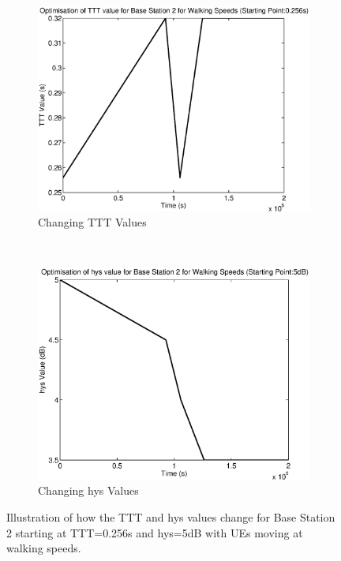 \begin{figure}[H]
        \centering
        \begin{subfigure}[b]{0.49\textwidth}
                \includegraphics[width=\textwidth]{figures/graphs/walkmid/TTT2.eps}
                \caption{Changing TTT Values}
        \end{subfigure}%
        ~ %
        \begin{subfigure}[b]{0.49\textwidth}
                \includegraphics[width=\textwidth]{figures/graphs/walkmid/hys2.eps}
                \caption{Changing hys Values}
        \end{subfigure}
        \caption{Illustration of how the TTT and hys values change for Base Station 2 starting at TTT=0.256s and hys=5dB with UEs moving at walking speeds.}
\end{figure}
